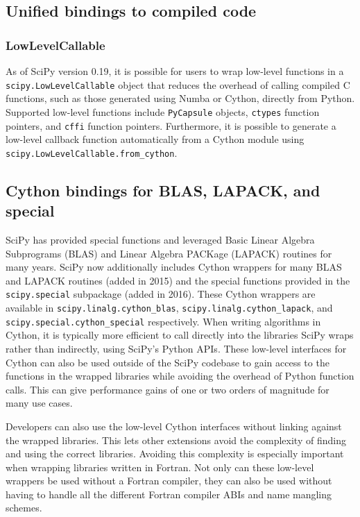 \documentclass[fleqn,10pt]{wlscirep}
\begin{document}


\subsection*{Unified bindings to compiled code}

\subsubsection*{LowLevelCallable}

As of SciPy version 0.19, it is possible for users to wrap low-level functions
in a \texttt{scipy.LowLevelCallable} object that reduces the overhead of
calling compiled C functions, such as those generated using Numba
or Cython, directly from Python.
Supported low-level functions include \texttt{PyCapsule}
objects, \texttt{ctypes} function pointers, and \texttt{cffi} function pointers.
Furthermore, it is possible to generate a low-level callback function
automatically from a Cython module using \texttt{scipy.LowLevelCallable.from\_cython}.

\subsection*{Cython bindings for BLAS, LAPACK, and special}

SciPy has provided special functions and leveraged
Basic Linear Algebra Subprograms (BLAS) and
Linear Algebra PACKage (LAPACK)\cite{LAPACK} routines for many years.
SciPy now additionally
includes Cython\cite{behnel2011cython} wrappers for
many BLAS and LAPACK routines (added in 2015) and the special functions
provided in the \texttt{scipy.{\allowbreak}special} subpackage (added in 2016).
These Cython wrappers are available in
\texttt{scipy.{\allowbreak}linalg.{\allowbreak}cython\_blas},
\texttt{scipy.{\allowbreak}linalg.{\allowbreak}cython\_lapack}, and
\texttt{scipy.{\allowbreak}special.{\allowbreak}cython\_special} respectively.
When writing algorithms in Cython, it is typically more efficient to call
directly into the libraries SciPy wraps rather than indirectly, using SciPy's
Python APIs.  These low-level interfaces for Cython can also be used outside of
the SciPy codebase to gain access to the functions in the wrapped libraries
while avoiding the overhead of Python function calls.  This can give
performance gains of one or two orders of magnitude for many use cases.

Developers can also use the low-level Cython interfaces without linking against
the wrapped libraries\cite{blas-lapack-wrappers-scipy-2015}.  This lets other
extensions avoid the complexity of finding and using the correct libraries.
Avoiding this complexity is especially important when wrapping libraries
written in Fortran.  Not only can these low-level wrappers be used without a
Fortran compiler, they can also be used without having to handle all the
different Fortran compiler ABIs and name mangling schemes.
\end{document}

